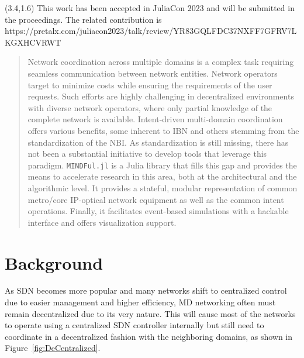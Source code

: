 \documentclass{juliacon}
\begin{document}


\maketitle

\begin{textblock}{13.5}(3.4,1.6)
    {\color{blue}
    This work has been accepted in JuliaCon 2023 and will be submitted in the proceedings. The related contribution is https://pretalx.com/juliacon2023/talk/review/YR83GQLFDC37NXFF7GFRV7LKGXHCVRWT 
    }
\end{textblock}

\begin{abstract}
    Network coordination across multiple domains is a complex task requiring seamless communication between network entities.
    Network operators target to minimize costs while ensuring the requirements of the user requests.
    Such efforts are highly challenging in decentralized environments with diverse network operators, where only partial knowledge of the complete network is available.
    Intent-driven multi-domain coordination offers various benefits, some inherent to \ac{IBN} and others stemming from the standardization of the \ac{NBI}.
    As standardization is still missing, there has not been a substantial initiative to develop tools that leverage this paradigm.
    \verb|MINDFul.jl| is a Julia library that fills this gap and provides the means to accelerate research in this area, both at the architectural and the algorithmic level.
    It provides a stateful, modular representation of common metro/core IP-optical network equipment as well as the common intent operations.
    Finally, it facilitates event-based simulations with a hackable interface and offers visualization support.
\end{abstract}

\acresetall


\section{Background}
    As \ac{SDN} \cite{2015SDN} becomes more popular and many networks shift to centralized control due to easier management and higher efficiency, \ac{MD} networking often must remain decentralized due to its very nature.
    This will cause most of the networks to operate using a centralized \ac{SDN} controller internally but still need to coordinate in a decentralized fashion with the neighboring domains, as shown in Figure~\ref{fig:DeCentralized}.
\end{document}
